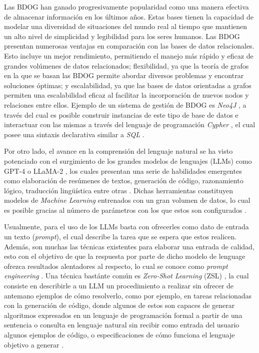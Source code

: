 Las BDOG han ganado progresivamente popularidad como una manera efectiva de almacenar información en los últimos años. Estas bases tienen la capacidad de modelar una diversidad de situaciones del mundo real al tiempo que mantienen un alto nivel de simplicidad y legibilidad para los seres humanos. Las BDOG presentan numerosas ventajas en comparación con las bases de datos relacionales. Esto incluye un mejor rendimiento, permitiendo el manejo más rápido y eficaz de grandes volúmenes de datos relacionados; flexibilidad, ya que la teoría de grafos en la que se basan las BDOG permite abordar diversos problemas y encontrar soluciones óptimas; y escalabilidad, ya que las bases de datos orientadas a grafos permiten una escalabilidad eficaz al facilitar la incorporación de nuevos nodos y relaciones entre ellos. Ejemplo de un sistema de gestión de BDOG es \textit{Neo4J} \cite{neo4j}, a través del cual es posible construir instancias de este tipo de base de datos e interactuar con las mismas a través del lenguaje de programación \textit{Cypher} \cite{cypher}, el cual posee una sintaxis declarativa similar a \textit{SQL} \cite{sqllang}.

Por otro lado, el avance en la comprensión del lenguaje natural se ha visto potenciado con el surgimiento de los grandes modelos de lenguajes (LLMs) \cite{llms} como GPT-4 \cite{gpt4} o LLaMA-2 \cite{llama2}, los cuales presentan una serie de habilidades emergentes como elaboración de resúmenes de textos, generación de código, razonamiento lógico, traducción lingüística entre otras \cite{llmsskills}. Dichas herramientas constituyen modelos de \textit{Machine Learning} entrenados con un gran volumen de datos, lo cual es posible gracias al número de parámetros con los que estos son configurados \cite{llmsparams}. 

Usualmente, para el uso de los LLMs basta con ofrecerles como dato de entrada un texto (\textit{prompt}), el cual describe la tarea que se espera que estos realicen. Además, son muchas las técnicas existentes para elaborar una entrada de calidad, esto con el objetivo de que la respuesta por parte de dicho modelo de lenguage ofrezca resultados alentadores al respecto, lo cual se conoce como \textit{prompt engineering} \cite{prompengineering}. Una técnica bastánte común es \textit{Zero-Shot Learning} (ZSL) \cite{zeroshotlearning}, la cual consiste en describirle a un LLM un procedimiento a realizar sin ofrecer de antemano ejemplos de cómo resolverlo, como por ejemplo, en tareas relacionadas con la generación de código, donde algunos de estos son capaces de generar algoritmos expresados en un lenguaje de programación formal a partir de una sentencia o consulta en lenguaje natural sin recibir como entrada del usuario algunos ejemplos de código, o especificaciones de cómo funciona el lenguaje objetivo a generar \cite{tex2code1} \cite{text2code2}. 

